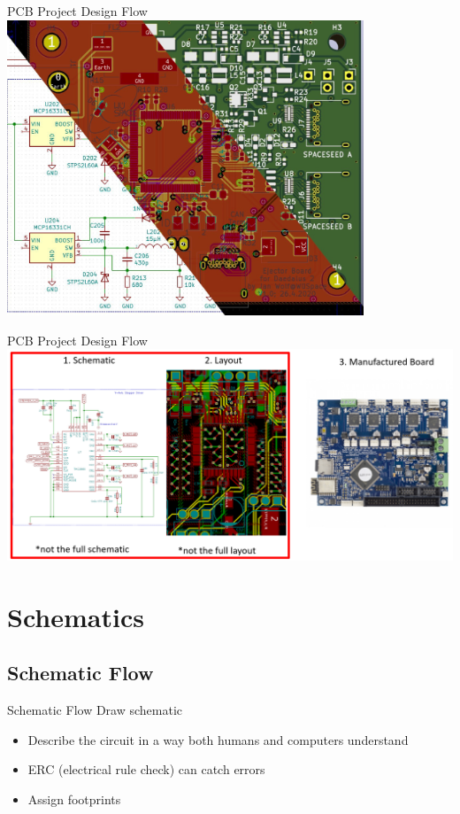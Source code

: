 \documentclass{beamer}
\begin{document}
\begin{frame}{PCB Project Design Flow}
  \centering
  \includegraphics[width=0.8\textwidth]{images/kicad-process.jpg}
\end{frame}

\begin{frame}{PCB Project Design Flow}
  \centering
  \includegraphics[width=\textwidth]{images/design-flow2.png}
\end{frame}

\section{Schematics}
\subsection{Schematic Flow}

\begin{frame}{Schematic Flow}
  Draw schematic
  \begin{itemize}
    \item Describe the circuit in a way both humans and computers understand
    \item ERC (electrical rule check) can catch errors
    \item Assign footprints 
  \end{itemize}
\end{frame}
\end{document}
